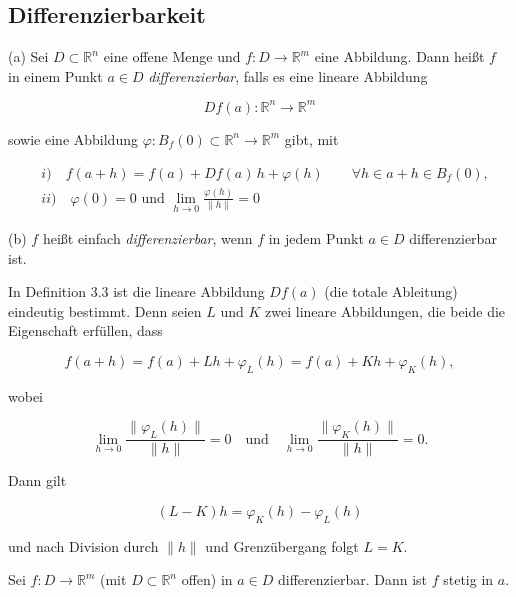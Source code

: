 \subsection{Differenzierbarkeit}

\begin{definition}{}{}
(a) Sei $ D \subset \mathbb{R}^n $ eine offene Menge und $ f: D \to \mathbb{R}^m $ eine Abbildung. Dann heißt $ f $ in einem Punkt $ a \in D $ \emph{differenzierbar}, falls es eine lineare Abbildung 


$$
    Df(a): \mathbb{R}^n \to \mathbb{R}^m
$$  


sowie eine Abbildung $\varphi: B_f(0) \subset \mathbb{R}^n \to \mathbb{R}^m$ gibt, mit


\begin{align*}
    & i)\quad f(a + h) = f(a) + Df(a)\,h + \varphi(h)  \qquad \forall h \in a + h \in B_f(0), \\
    & ii)\quad \varphi(0) = 0  \text{ und } \lim_{h \to 0} \frac{\varphi(h)}{\|h\|} = 0
\end{align*}

(b) $ f $ heißt einfach \emph{differenzierbar}, wenn $ f $ in jedem Punkt $ a\in D $ differenzierbar ist.
\end{definition}

\begin{bemerkungbox}
In Definition 3.3 ist die lineare Abbildung $ Df(a) $ (die totale Ableitung) eindeutig bestimmt. Denn seien $ L $ und $ K $ zwei lineare Abbildungen, die beide die Eigenschaft erfüllen, dass


$$
f(a+h) = f(a) + Lh + \varphi_L(h) = f(a) + Kh + \varphi_K(h),
$$


wobei


$$
\lim_{h\to 0}\frac{\|\varphi_L(h)\|}{\|h\|} = 0 \quad\text{und}\quad \lim_{h\to 0}\frac{\|\varphi_K(h)\|}{\|h\|} = 0.
$$


Dann gilt


$$
(L-K)h = \varphi_K(h) - \varphi_L(h)
$$


und nach Division durch $\|h\|$ und Grenzübergang folgt $ L = K $.
\end{bemerkungbox}

\begin{satz}{}
Sei $ f: D \to \mathbb{R}^m $ (mit $ D \subset \mathbb{R}^n $ offen) in $ a \in D$ differenzierbar. Dann ist $ f $ stetig in $ a$.
\end{satz}

